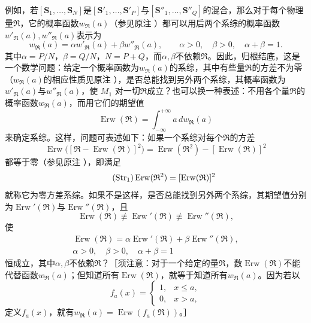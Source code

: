 \documentclass[fontsize=13pt,twoside,openany,headings=normal,parskip=false,bookmarkpackage=false,DIV=calc]{scrbook}
\begin{document}
例如，若$[\boldsymbol{S}_1,\allowbreak \ldots,\allowbreak \boldsymbol{S}_N]$是$[\boldsymbol{S}'_1,\allowbreak \ldots,\allowbreak \boldsymbol{S}'_P]$与$[\boldsymbol{S}''_1,\allowbreak \ldots,\allowbreak \boldsymbol{S}''_Q]$的混合，那么对于每个物理量$\mathfrak R$，它的概率函数$w_{\mathfrak R}(a)$（参见原注 \hyperlink{note-157}{}）都可以用后两个系综的概率函数$w'_{\mathfrak R}(a),\allowbreak w''_{\mathfrak R}(a)$表示为
\begin{equation}\tag{$M_1$}\label{eq:IV.1.M1}
w_{\mathfrak R}(a)=\alpha w'_{\mathfrak R}(a)+\beta w''_{\mathfrak R}(a),\qquad
\alpha>0,\quad\beta>0,\quad\alpha+\beta=1.
\end{equation}
其中$\alpha=P/N$，$\beta=Q/N$，$N=P+Q$，而$\alpha,\allowbreak \beta$不依赖$\mathfrak R$。因此，归根结底，这是一个数学问题：给定一个概率函数为$w_{\mathfrak R}(a)$的系综，其中有些量$\mathfrak R$的方差不为零（$w_{\mathfrak R}(a)$的相应性质见原注 \hyperlink{note-160}{}），是否总能找到另外两个系综，其概率函数为$w'_{\mathfrak R}(a)$与$w''_{\mathfrak R}(a)$，使 \hyperref[eq:IV.1.M1]{$M_1$} 对一切$\mathfrak R$成立？也可以换一种表述：不用各个量$\mathfrak R$的概率函数$w_{\mathfrak R}(a)$，而用它们的期望值
\[
\operatorname{Erw}(\mathfrak R)=\int_{-\infty}^{+\infty}a\,dw_{\mathfrak R}(a)
\]
来确定系综。这样，问题可表述如下：如果一个系综\hypertarget{origpage-163}{}\label{origpage-163}对每个$\mathfrak R$的方差
\[
\operatorname{Erw}\bigl([\mathfrak R-\operatorname{Erw}(\mathfrak R)]^2\bigr)
=\operatorname{Erw}(\mathfrak R^2)-[\operatorname{Erw}(\mathfrak R)]^2
\]
都等于零（参见原注 \hyperlink{note-160}{}），即满足
\begin{equation}\tag{$\mathrm{Str}_1$}\label{eq:IV.1.Str1}
\operatorname{Erw}(\mathfrak R^2)=[\operatorname{Erw}(\mathfrak R)]^2
\end{equation}
就称它为零方差系综。如果不是这样，是否总能找到另外两个系综，其期望值分别为$\operatorname{Erw}'(\mathfrak R)$与$\operatorname{Erw}''(\mathfrak R)$，且
\[
\operatorname{Erw}(\mathfrak R)\not\equiv\operatorname{Erw}'(\mathfrak R)
\not\equiv\operatorname{Erw}''(\mathfrak R),
\]
使
\begin{equation}\tag{$M_2$}\label{eq:IV.1.M2}
\begin{gathered}
\operatorname{Erw}(\mathfrak R)=\alpha\operatorname{Erw}'(\mathfrak R)+\beta\operatorname{Erw}''(\mathfrak R),\\
\alpha>0,\quad\beta>0,\quad\alpha+\beta=1
\end{gathered}
\end{equation}
恒成立，其中$\alpha,\allowbreak \beta$不依赖$\mathfrak R$？［须注意：对于一个给定的量$\mathfrak R$，数$\operatorname{Erw}(\mathfrak R)$不能代替函数$w_{\mathfrak R}(a)$；但知道所有$\operatorname{Erw}(\mathfrak R)$，就等于知道所有$w_{\mathfrak R}(a)$。因为若以
\[
f_a(x)=\begin{cases}1,&x\leq a,\\0,&x>a,\end{cases}
\]
定义$f_a(x)$，就有$w_{\mathfrak R}(a)=\operatorname{Erw}(f_a(\mathfrak R))$。］
\end{document}
